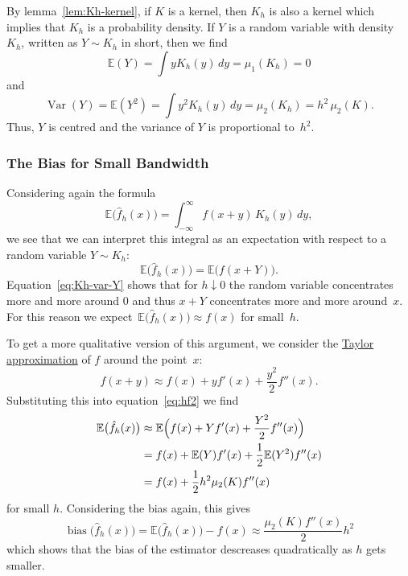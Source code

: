 \documentclass[
  a4paper,
]{article}
\theoremstyle{definition}
\theoremstyle{definition}
\theoremstyle{definition}
\theoremstyle{definition}
\theoremstyle{remark}
\begin{document}
By lemma~\ref{lem:Kh-kernel}, if \(K\) is a kernel, then \(K_h\) is also a kernel which
implies that \(K_h\) is a probability density. If \(Y\) is a random variable with
density \(K_h\), written as \(Y \sim K_h\) in short, then we find
\begin{equation*}
  \mathbb{E}(Y)
  = \int y K_h(y) \,dy
  = \mu_1(K_h)
  = 0
\end{equation*}
and
\begin{equation}
  \mathop{\mathrm{Var}}(Y)
  = \mathbb{E}(Y^2)
  = \int y^2 K_h(y) \,dy
  = \mu_2(K_h)
  = h^2 \, \mu_2(K).  \label{eq:Kh-var-Y}
\end{equation}
Thus, \(Y\) is centred and the variance of \(Y\) is proportional to~\(h^2\).

\subsubsection{The Bias for Small Bandwidth}\label{the-bias-for-small-bandwidth}

Considering again the formula
\begin{equation*}
    \mathbb{E}\bigl(\hat f_h(x)\bigr)
    = \int_{-\infty}^\infty f(x+y) \, K_h(y) \, dy,
\end{equation*}
we see that we can interpret this integral as an expectation
with respect to a random variable \(Y \sim K_h\):
\begin{equation}
    \mathbb{E}\bigl(\hat f_h(x)\bigr)
    = \mathbb{E}\bigl( f(x+Y) \bigr).  \label{eq:hf2}
\end{equation}
Equation~\eqref{eq:Kh-var-Y} shows that for \(h \downarrow 0\) the random
variable concentrates more and more around \(0\) and thus \(x+Y\) concentrates
more and more around~\(x\). For this reason we
expect~\(\mathbb{E}\bigl(\hat f_h(x)\bigr) \approx f(x)\) for small~\(h\).

To get a more qualitative version of this argument, we consider the
\href{https://en.wikipedia.org/wiki/Taylor\%27s_theorem}{Taylor approximation}
of \(f\) around the point~\(x\):
\begin{equation*}
  f(x + y)
  \approx f(x) + y f'(x) + \frac{y^2}{2} f''(x).
\end{equation*}
Substituting this into equation~\eqref{eq:hf2} we find
\begin{align*}
    \mathbb{E}\bigl(\hat f_h(x)\bigr)
    &\approx \mathbb{E}\Bigl( f(x) + Y f'(x) + \frac{Y^2}{2} f''(x) \Bigr) \\
    &= f(x) + \mathbb{E}(Y) f'(x) + \frac12 \mathbb{E}(Y^2) f''(x) \\
    &= f(x) + \frac12 h^2 \mu_2(K) f''(x)
\end{align*}
for small \(h\). Considering the bias again, this gives
\begin{equation}
  \mathop{\mathrm{bias}}\bigl( \hat f_h(x) \bigr)
  = \mathbb{E}\bigl( \hat f_h(x) \bigr) - f(x)
  \approx \frac{\mu_2(K) f''(x)}{2} h^2  \label{eq:fhatbias}
\end{equation}
which shows that the bias of the estimator descreases quadratically
as \(h\) gets smaller.
\end{document}
